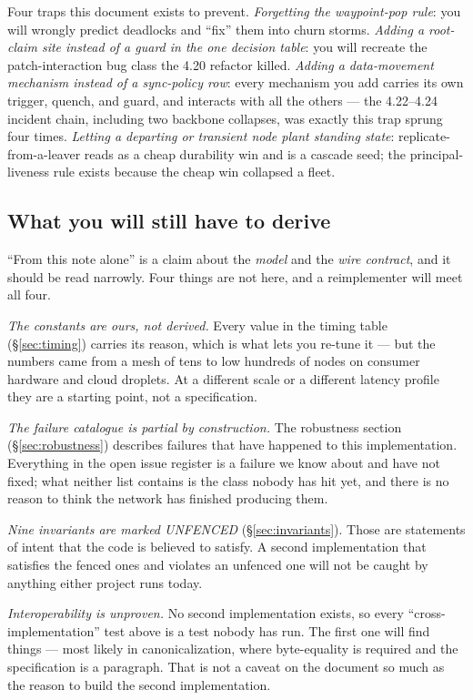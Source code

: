 \documentclass[nobib]{tufte-handout}
\begin{document}
Four traps this document exists to prevent. \emph{Forgetting the
waypoint-pop rule}: you will wrongly predict deadlocks and ``fix'' them
into churn storms. \emph{Adding a root-claim site instead of a guard in
the one decision table}: you will recreate the patch-interaction bug
class the 4.20 refactor killed. \emph{Adding a data-movement mechanism
instead of a sync-policy row}: every mechanism you add carries its own
trigger, quench, and guard, and interacts with all the others --- the
4.22--4.24 incident chain, including two backbone collapses, was
exactly this trap sprung four times. \emph{Letting a departing or
transient node plant standing state}: replicate-from-a-leaver reads as
a cheap durability win and is a cascade seed; the principal-liveness
rule exists because the cheap win collapsed a fleet.

\subsection{What you will still have to derive}

``From this note alone'' is a claim about the \emph{model} and the
\emph{wire contract}, and it should be read narrowly. Four things are
not here, and a reimplementer will meet all four.

\emph{The constants are ours, not derived.} Every value in the timing
table (\S\ref{sec:timing}) carries its reason, which is what lets you
re-tune it --- but the numbers came from a mesh of tens to low hundreds
of nodes on consumer hardware and cloud droplets. At a different scale
or a different latency profile they are a starting point, not a
specification.

\emph{The failure catalogue is partial by construction.} The robustness
section (\S\ref{sec:robustness}) describes failures that have happened
to this implementation. Everything in the open issue register is a
failure we know about and have not fixed; what neither list contains is
the class nobody has hit yet, and there is no reason to think the
network has finished producing them.

\emph{Nine invariants are marked UNFENCED} (\S\ref{sec:invariants}). Those are
statements of intent that the code is believed to satisfy. A second
implementation that satisfies the fenced ones and violates an unfenced
one will not be caught by anything either project runs today.

\emph{Interoperability is unproven.} No second implementation exists,
so every ``cross-implementation'' test above is a test nobody has run.
The first one will find things --- most likely in canonicalization,
where byte-equality is required and the specification is a paragraph.
That is not a caveat on the document so much as the reason to build the
second implementation.
\end{document}
